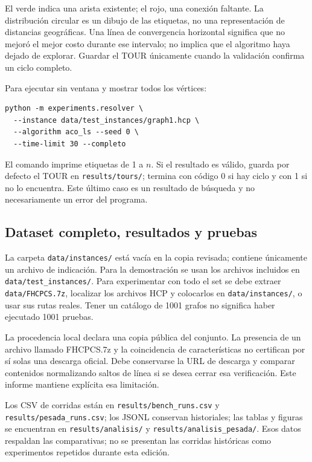 \documentclass[
  spanish,
  12pt,
]{article}
\begin{document}
El verde indica una arista existente; el rojo, una conexión faltante. La distribución circular es un dibujo de las etiquetas, no una representación de distancias geográficas. Una línea de convergencia horizontal significa que no mejoró el mejor costo durante ese intervalo; no implica que el algoritmo haya dejado de explorar. Guardar el TOUR únicamente cuando la validación confirma un ciclo completo.

Para ejecutar sin ventana y mostrar todos los vértices:
\begin{Verbatim}[fontsize=\small,breaklines=true]
python -m experiments.resolver \
  --instance data/test_instances/graph1.hcp \
  --algorithm aco_ls --seed 0 \
  --time-limit 30 --completo
\end{Verbatim}
El comando imprime etiquetas de 1 a $n$. Si el resultado es válido, guarda por defecto el TOUR en \texttt{results/tours/}; termina con código 0 si hay ciclo y con 1 si no lo encuentra. Este último caso es un resultado de búsqueda y no necesariamente un error del programa.

\subsection{Dataset completo, resultados y pruebas}
La carpeta \texttt{data/instances/} está vacía en la copia revisada; contiene únicamente un archivo de indicación. Para la demostración se usan los archivos incluidos en \texttt{data/test\_instances/}. Para experimentar con todo el set se debe extraer \texttt{data/FHCPCS.7z}, localizar los archivos HCP y colocarlos en \texttt{data/instances/}, o usar sus rutas reales. Tener un catálogo de 1001 grafos no significa haber ejecutado 1001 pruebas.

La procedencia local declara una copia pública del conjunto. La presencia de un archivo llamado FHCPCS.7z y la coincidencia de características no certifican por sí solas una descarga oficial. Debe conservarse la URL de descarga y comparar contenidos normalizando saltos de línea si se desea cerrar esa verificación. Este informe mantiene explícita esa limitación.

Los CSV de corridas están en \texttt{results/bench\_runs.csv} y \texttt{results/pesada\_runs.csv}; los JSONL conservan historiales; las tablas y figuras se encuentran en \texttt{results/analisis/} y \texttt{results/analisis\_pesada/}. Esos datos respaldan las comparativas; no se presentan las corridas históricas como experimentos repetidos durante esta edición.
\end{document}
